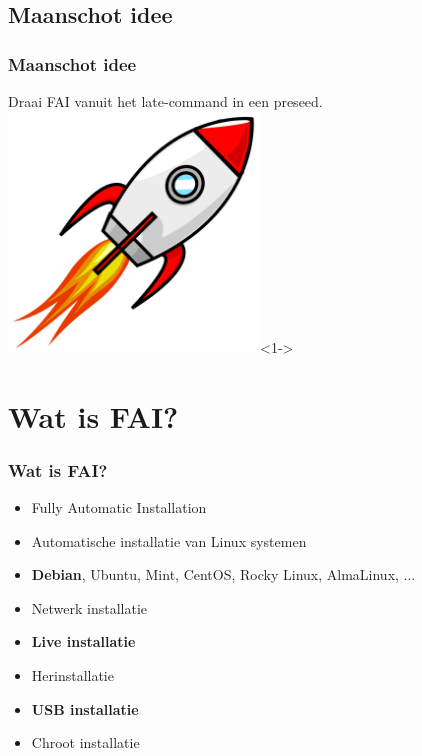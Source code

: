 \documentclass{beamer}
\begin{document}
\subsection{Maanschot idee}
\begin{frame}
\frametitle{Maanschot idee}
Draai FAI vanuit het late-command in een preseed.
\centering
\includegraphics[width=0.5\textwidth]{img/Cartoon_space_rocket.png}<1->
\end{frame}

\section{Wat is FAI?}
\begin{frame}
\frametitle{Wat is FAI?}
\begin{itemize}
  \item Fully Automatic Installation
  \item Automatische installatie van Linux systemen
  \item \textbf{Debian}, Ubuntu, Mint, CentOS, Rocky Linux, AlmaLinux, ...
  \item Netwerk installatie
  \item \textbf{Live installatie}
  \item Herinstallatie
  \item \textbf{USB installatie}
  \item Chroot installatie
\end{itemize}
\end{frame}
\end{document}
